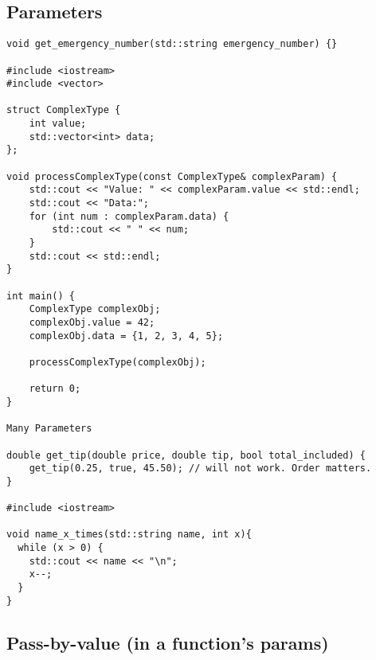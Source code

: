 \subsection{Parameters}

\begin{verbatim}
void get_emergency_number(std::string emergency_number) {}

#include <iostream>
#include <vector>

struct ComplexType {
    int value;
    std::vector<int> data;
};

void processComplexType(const ComplexType& complexParam) {
    std::cout << "Value: " << complexParam.value << std::endl;
    std::cout << "Data:";
    for (int num : complexParam.data) {
        std::cout << " " << num;
    }
    std::cout << std::endl;
}

int main() {
    ComplexType complexObj;
    complexObj.value = 42;
    complexObj.data = {1, 2, 3, 4, 5};

    processComplexType(complexObj);

    return 0;
}

Many Parameters

double get_tip(double price, double tip, bool total_included) {
    get_tip(0.25, true, 45.50); // will not work. Order matters. 
}

#include <iostream>

void name_x_times(std::string name, int x){
  while (x > 0) {
    std::cout << name << "\n";
    x--;
  }
}
\end{verbatim}

\subsection{Pass-by-value (in a function's params)}

